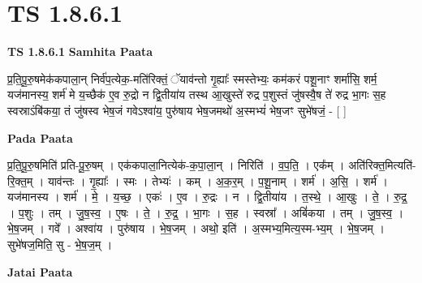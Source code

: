 \documentclass[17pt]{extarticle}
\begin{document}
\section*{ TS 1.8.6.1 }

\textbf{TS 1.8.6.1 } \newline
\textbf{Samhita Paata} \newline

प्र॒ति॒पू॒रु॒षमेक॑कपाला॒न् निर्व॑प॒त्येक॒-मति॑रिक्तं॒ ॅयाव॑न्तो गृ॒ह्याः᳚ स्मस्तेभ्यः॒ कम॑करं पशू॒नाꣳ शर्मा॑सि॒ शर्म॒ यज॑मानस्य॒ शर्म॑ मे य॒च्छैक॑ ए॒व रु॒द्रो न द्वि॒तीया॑य तस्थ आ॒खुस्ते॑ रुद्र प॒शुस्तं जु॑षस्वै॒ष ते॑ रुद्र भा॒गः स॒ह स्वस्राऽंबि॑कया॒ तं जु॑षस्व भेष॒जं गवेऽश्वा॑य॒ पुरु॑षाय भेष॒जमथो॑ अ॒स्मभ्यं॑ भेष॒जꣳ सुभे॑षजं॒ - [ ] \newline

\textbf{Pada Paata} \newline

प्र॒ति॒पू॒रु॒षमिति॑ प्रति-पू॒रु॒षम् । एक॑कपाला॒नित्येक॑-क॒पा॒ला॒न् । निरिति॑ । व॒प॒ति॒ । एक᳚म् । अति॑रिक्त॒मित्यति॑-रि॒क्त॒म् । याव॑न्तः । गृ॒ह्याः᳚ । स्मः । तेभ्यः॑ । कम् । अ॒क॒र॒म् । प॒शू॒नाम् । शर्म॑ । अ॒सि॒ । शर्म॑ । यज॑मानस्य । शर्म॑ । मे॒ । य॒च्छ॒ । एकः॑ । ए॒व । रु॒द्रः । न । द्वि॒तीया॑य । त॒स्थे॒ । आ॒खुः । ते॒ । रु॒द्र॒ । प॒शुः । तम् । जु॒ष॒स्व॒ । ए॒षः । ते॒ । रु॒द्र॒ । भा॒गः । स॒ह । स्वस्रा᳚ । अबिं॑कया । तम् । जु॒ष॒स्व॒ । भे॒ष॒जम् । गवे᳚ । अश्वा॑य । पुरु॑षाय । भे॒ष॒जम् । अथो॒ इति॑ । अ॒स्मभ्य॒मित्य॒स्म-भ्य॒म् । भे॒ष॒जम् । सुभे॑षज॒मिति॒ सु - भे॒ष॒ज॒म् ।  \newline



\textbf{Jatai Paata} \newline
\end{document}

